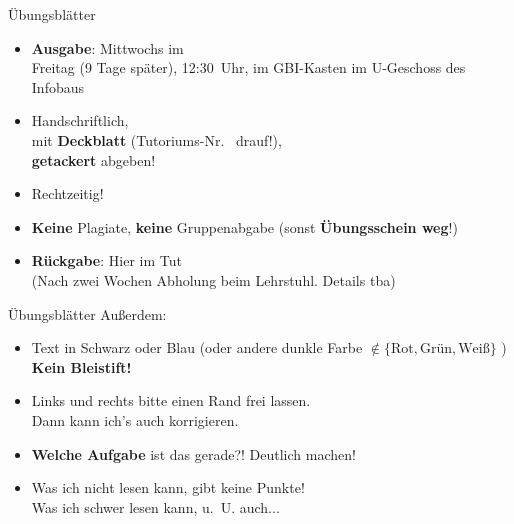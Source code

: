 \begin{frame}{Übungsblätter}
	\begin{itemize}
		\item \textbf{Ausgabe}: Mittwochs im \ILIAS \\
			   Freitag (9 Tage später), 12:30~Uhr, im GBI-Kasten im U-Geschoss des Infobaus
		\pause
		\item Handschriftlich, \\ 
		mit \textbf{Deckblatt} (Tutoriums-Nr. \mytutnumber\  drauf!), \\ 
		\textbf{getackert} abgeben!
		\item Rechtzeitig! 
		\item \textbf{Keine} Plagiate, \textbf{keine} Gruppenabgabe (sonst \textbf{Übungsschein weg}!) 
		\pause
		\item \textbf{Rückgabe}: Hier im Tut \\ (Nach zwei Wochen Abholung beim Lehrstuhl. Details tba)
	\end{itemize}
\end{frame}

\begin{frame}{Übungsblätter}
	Außerdem:
	\begin{itemize}
		\item Text in Schwarz oder Blau (oder andere dunkle Farbe $\notin \{\text{Rot}, \text{Grün}, \text{Weiß}\}$ ) \\
			  \textbf{Kein Bleistift!}
		\item Links und rechts bitte einen Rand frei lassen. \\
			  Dann kann ich's auch korrigieren. \smiley
		\item \textbf{Welche Aufgabe} ist das gerade?! \impl Deutlich machen!
		\item Was ich nicht lesen kann, gibt keine Punkte! \\
			  \small Was ich schwer lesen kann, u.~U. auch... 
	\end{itemize}
\end{frame}




